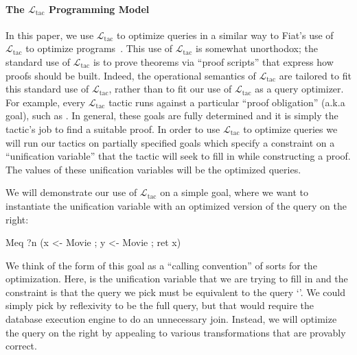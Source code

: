 \documentclass{sigplanconf}
\newcommand{\ltac}[0]{\ensuremath{\mathcal{L}_{\mathrm{tac}}}}
\begin{document}
\paragraph{The \ltac{} Programming Model}
In this paper, we use \ltac{} to optimize queries in a similar way to Fiat's use of \ltac{} to optimize programs~\cite{DBLP:conf/popl/DelawarePGC15}.
This use of \ltac{} is somewhat unorthodox; the standard use of \ltac{} is to prove theorems via ``proof scripts'' that express how proofs should be built.
Indeed, the operational semantics of \ltac{} are tailored to fit this standard use of \ltac{}, rather than to fit our use of \ltac{} as a query optimizer.
For example, every \ltac{} tactic runs against a particular ``proof obligation'' (a.k.a goal), such as .
In general, these goals are fully determined and it is simply the tactic's job to find a suitable proof.
In order to use \ltac{} to optimize queries we will run our tactics on partially specified goals which specify a constraint on a ``unification variable'' that the tactic will seek to fill in while constructing a proof.
The values of these unification variables will be the optimized queries.


We will demonstrate our use of \ltac{} on a simple goal, where we want to instantiate the unification variable  with an optimized version of the query on the right:
\begin{coq}
Meq ?n (x <- Movie ; y <- Movie ; ret x)
\end{coq}
We think of the form of this goal as a ``calling convention'' of sorts for the optimization.
Here,  is the unification variable that we are trying to fill in and the constraint is that the query we pick must be equivalent to the query `'.
We could simply pick  by reflexivity to be the full query, but that would require the database execution engine to do an unnecessary join.
Instead, we will optimize the query on the right by appealing to various transformations that are provably correct.
\end{document}

